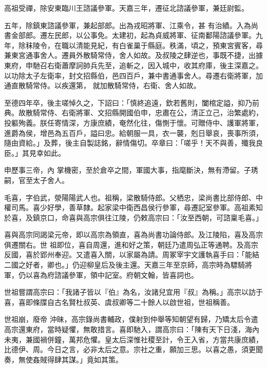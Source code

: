 \begin{pinyinscope}
 高祖受禪，除安東臨川王諮議參軍。天嘉三年，遷征北諮議參軍，兼廷尉監。



 五年，除鎮東諮議參軍，兼起部郎。出為戎昭將軍、江乘令，甚
 有治績。入為尚書金部郎。遷左民郎，以公事免。太建初，起為貞威將軍、征南鄱陽諮議參軍。九年，除秣陵令，在職以清能見紀，有白雀巢于縣庭。秩滿，頃之，預東宮賓客，尋兼東宮通事舍人。遷員外散騎常侍，舍人如故。及叔陵之肆逆也，事既不捷，出據東府，申馳召右衛蕭摩訶帥兵先至，追斬之，因入城中，收其府庫，後主深嘉之。以功除太子左衛率，封文招縣伯，邑四百戶，兼中書通事舍人。尋遷右衛將軍，加通直散騎常侍。以疾還第，
 就加散騎常侍，右衛、舍人如故。



 至德四年卒，後主嗟悼久之，下詔曰：「慎終追遠，欽若舊則，闔棺定謚，抑乃前典。故散騎常侍、右衛將軍、文招縣開國伯申，忠肅在公，清正立己，治繁處約，投軀殉義。朕任寄情深，方康庶績，奄然化往，傷惻于懷。可贈侍中、護軍將軍，進爵為侯，增邑為五百戶，謚曰忠。給朝服一具，衣一襲，剋日舉哀，喪事所須，隨由資給。」及葬，後主自製誌銘，辭情傷切。卒章曰：「嗟乎！天不與善，殲我良臣。」其見幸如此。



 申歷事三帝，內
 掌機密，至於倉卒之間，軍國大事，指麾斷決，無有滯留。子琇嗣，官至太子舍人。



 毛喜，字伯武，滎陽陽武人也。祖稱，梁散騎侍郎。父栖忠，梁尚書比部侍郎、中權司馬。喜少好學，善草隸。起家梁中衛西昌侯行參軍，尋遷記室參軍。高祖素知於喜，及鎮京口，命喜與高宗俱往江陵，仍敕高宗曰：「汝至西朝，可諮稟毛喜。」



 喜與高宗同謁梁元帝，即以高宗為領直，喜為尚書功論侍郎。及江陵陷，喜及高宗俱遷關右。世
 祖即位，喜自周還，進和好之策，朝廷乃遣周弘正等通聘。及高宗反國，喜於郢州奉迎。又遣喜入關，以家屬為請。周冢宰宇文護執喜手曰：「能結二國之好者，卿也。」仍迎柳皇后及後主還。天嘉三年至京師，高宗時為驃騎將軍，仍以喜為府諮議參軍，領中記室。府朝文翰，皆喜詞也。



 世祖嘗謂高宗曰：「我諸子皆以『伯』為名，汝諸兒宜用『叔』為稱。」高宗以訪于喜，喜即條牒自古名賢杜叔英、虞叔卿等二十餘人以啟世祖，世祖稱善。



 世祖崩，廢帝
 沖昧，高宗錄尚書輔政，僕射到仲舉等知朝望有歸，乃矯太后令遣高宗還東府，當時疑懼，無敢措言。喜即馳入，謂高宗曰：「陳有天下日淺，海內未夷，兼國禍併鐘，萬邦危懼。皇太后深惟社稷至計，令王入省，方當共康庶績，比德伊、周。今日之言，必非太后之意。宗社之重，願加三思。以喜之愚，須更聞奏，無使姦賊得肆其謀。」竟如其策。




\end{pinyinscope}
